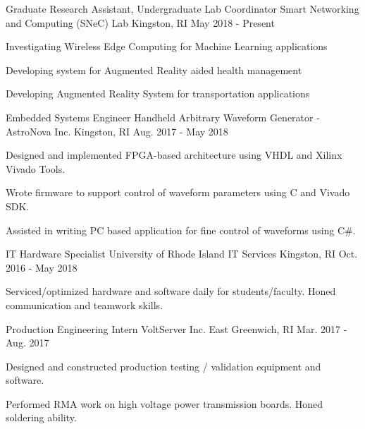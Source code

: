 \begin{cventries}

  \cventry
    {Graduate Research Assistant, Undergraduate Lab Coordinator}
    {Smart Networking and Computing (SNeC) Lab}
    {Kingston, RI}
    {May 2018 - Present}
    {
      \begin{cvitems}
        \item{Investigating Wireless Edge Computing for Machine Learning applications}
        \item{Developing system for Augmented Reality aided health management}
        \item{Developing Augmented Reality System for transportation applications} 
      \end{cvitems}
    }
    
  \cventry
    {Embedded Systems Engineer}
    {Handheld Arbitrary Waveform Generator - AstroNova Inc.}
    {Kingston, RI}
    {Aug. 2017 - May 2018}
    {
      \begin{cvitems}
        \item {Designed and implemented FPGA-based architecture using VHDL and Xilinx Vivado Tools.}
        \item {Wrote firmware to support control of waveform parameters using C and Vivado SDK.}
        \item {Assisted in writing PC based application for fine control of waveforms using C\#.}
      \end{cvitems}
    }
\cventry
    {IT Hardware Specialist}
    {University of Rhode Island IT Services}
    {Kingston, RI}
    {Oct. 2016 - May 2018}
    {
      \begin{cvitems}
        \item {Serviced/optimized hardware and software daily for students/faculty. Honed communication and teamwork skills.}
      \end{cvitems}
    }
  \cventry
    {Production Engineering Intern}
    {VoltServer Inc.}
    {East Greenwich, RI}
    {Mar. 2017 - Aug. 2017}
    {
      \begin{cvitems}
        \item {Designed and constructed production testing / validation equipment and software.}
        \item {Performed RMA work on high voltage power transmission boards. Honed soldering ability.}
      \end{cvitems}
    }
 \end{cventries}